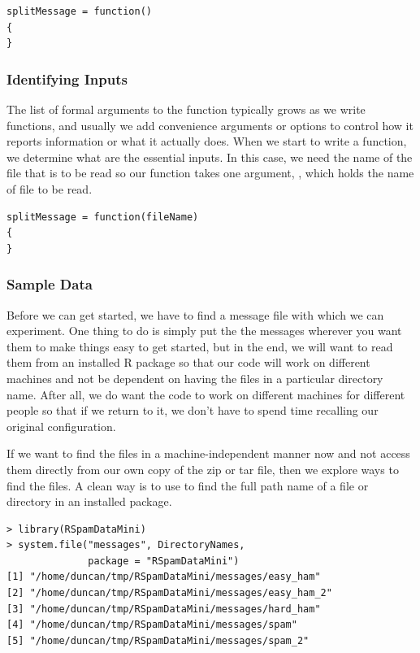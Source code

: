 \begin{verbatim}
splitMessage = function() 
{
}
\end{verbatim}

\subsubsection{Identifying Inputs}
The list of formal arguments to the function typically grows as we 
write functions,
and usually we add convenience arguments or options to control how it
reports information or what it actually does.  When we start to write
a function, we determine what are the essential inputs.  In this case,
we need the name of the file that is to be read so our function
 takes one argument, ,
which holds the name of file to be read.

\begin{verbatim}
splitMessage = function(fileName) 
{
}
\end{verbatim}


\subsubsection{Sample Data}
Before we can get started, we have to find a message file
with which we can experiment.  One thing to do is simply put the
the messages wherever you want them to make things easy to get
started, but in the end, we will want to read them from
an installed R package so that our code will work on different machines
and not be dependent on having the files in a particular directory
name. After all, we do want the code to work on different machines for
different people so that if we return to it, we don't have to spend
time recalling our original configuration.

If we want to find the files in a machine-independent
manner now and not access them directly from our own copy 
of the zip or tar file, then we explore ways to find the files.
A clean way is  to use 
to find the full path name of a file or directory in an installed package.
\begin{verbatim}
> library(RSpamDataMini)
> system.file("messages", DirectoryNames, 
              package = "RSpamDataMini")
[1] "/home/duncan/tmp/RSpamDataMini/messages/easy_ham"  
[2] "/home/duncan/tmp/RSpamDataMini/messages/easy_ham_2"
[3] "/home/duncan/tmp/RSpamDataMini/messages/hard_ham"  
[4] "/home/duncan/tmp/RSpamDataMini/messages/spam"      
[5] "/home/duncan/tmp/RSpamDataMini/messages/spam_2"    
\end{verbatim}


